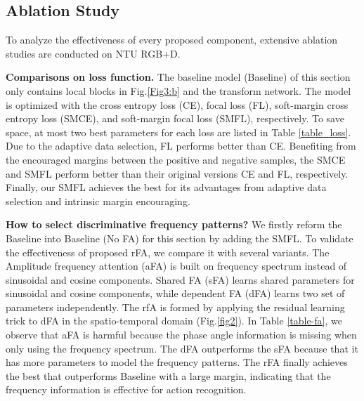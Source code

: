\documentclass{article}
\begin{document}
\subsection{Ablation Study}
To analyze the effectiveness of every proposed component, extensive ablation studies are conducted on NTU RGB+D.




\noindent\textbf{Comparisons on loss function.}
The baseline model (Baseline) of this section only contains local blocks in Fig.\ref{Fig3:b} and the transform network. The model is optimized with the cross entropy loss (CE), focal loss (FL), soft-margin cross entropy loss (SMCE), and soft-margin focal loss (SMFL), respectively. To save space, at most two best parameters for each loss are listed in Table \ref{table_loss}. Due to the adaptive data selection, FL performs better than CE. Benefiting from the encouraged margins between the positive and negative samples, the SMCE and SMFL perform better than their original versions CE and FL, respectively. Finally, our SMFL achieves the best for its advantages from adaptive data selection and intrinsic margin encouraging.

\noindent\textbf{How to select discriminative frequency patterns?} We firstly reform the Baseline into Baseline (No FA) for this section by adding the SMFL. To validate the effectiveness of proposed rFA, we compare it with several variants. The Amplitude frequency attention (aFA) is built on frequency spectrum instead of sinusoidal and cosine components. Shared FA (sFA) learns shared parameters for sinusoidal and cosine components, while dependent FA (dFA) learns two set of parameters independently. The rfA is formed by applying the residual learning trick to dFA in the spatio-temporal domain (Fig.\ref{fig2}). In Table \ref{table-fa}, we observe that aFA is harmful because the phase angle information is missing when only using the frequency spectrum. The dFA outperforms the sFA because that it has more parameters to model the frequency patterns. The rFA finally achieves the best that outperforms Baseline with a large margin, indicating that the frequency information is effective for action recognition.
\end{document}
